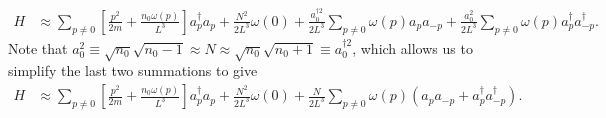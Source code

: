 \documentclass[english, parskip=full]{scrartcl}
\newcommand{\kla}{}
\newcommand{\klam}{}
\begin{document}
\begin{align}
H&\approx\sum_{p\neq 0}\klam\left[ {\frac{p^2}{2m}+\frac{n_0\omega (p)}{L^3}} \right]a_p^\dagger a_p+\frac{N^2}{2L^3}\omega (0)+\frac{a_0^{\dagger 2}}{2L^3}\sum_{p\neq 0}\omega (p) a_pa_{-p}+\frac{a_0^2}{2L^3}\sum_{p\neq 0}\omega (p) a_p^\dagger a_{-p}^\dagger.
\end{align}
Note that $a_0^2\equiv\sqrt{n_0}\sqrt{n_0-1}\approx N\approx \sqrt{n_0}\sqrt{n_0+1}\equiv a_0^{\dagger 2}$, which allows us to simplify the last two summations to give
\begin{align}
H&\approx\sum_{p\neq 0}\klam\left[ {\frac{p^2}{2m}+\frac{n_0\omega (p)}{L^3}} \right]a_p^\dagger a_p+\frac{N^2}{2L^3}\omega (0)+\frac{N}{2L^3}\sum_{p\neq 0}\omega (p) \kla\left( {a_pa_{-p} + a_p^\dagger a_{-p}^\dagger} \right).
\end{align}
\end{document}
